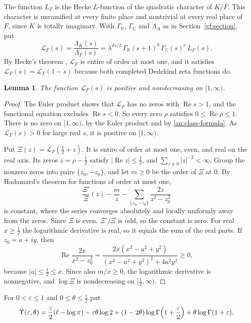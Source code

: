 \documentclass[11pt]{amsart}
\numberwithin{equation}{section}
\newtheorem{lemma}[equation]{Lemma}
\theoremstyle{definition}
\theoremstyle{remark}
\newcommand{\R}{\mathbb R}
\newcommand{\C}{\mathbb C}
\begin{document}
The function $L_F$ is the Hecke $L$-function of the quadratic character of
$K/F$. This character is unramified at every finite place and nontrivial at
every real place of $F$, since $K$ is totally imaginary. With $\Gamma_\R$,
$\Gamma_\C$ and $\Lambda_A$ as in Section~\ref{gf:section}, put
\begin{equation}\label{an:completion}
 \mathcal L_F(s)=\frac{\Lambda_K(s)}{\Lambda_F(s)}
 =\lambda^{ds/2}\,\Gamma_\R(s+1)^b\,\Gamma_\C(s)^c\,L_F(s).
\end{equation}
By Hecke's theorem \cite{Hecke1920,Tate1967}, $\mathcal L_F$ is entire of
order at most one, and it satisfies $\mathcal L_F(s)=\mathcal L_F(1-s)$
because both completed Dedekind zeta functions do.

\begin{lemma}\label{an:monotonicity}
The function $\mathcal L_F(s)$ is positive and nondecreasing on $[1,\infty)$.
\end{lemma}

\begin{proof}
The Euler product shows that $\mathcal L_F$ has no zeros with
$\operatorname{Re}s>1$, and the functional equation excludes
$\operatorname{Re}s<0$. So every zero $\rho$ satisfies $0\le\operatorname{Re}
\rho\le1$. There is no zero on $[1,\infty)$, by the Euler product and by
\eqref{an:class-formula}. As $\mathcal L_F(s)>0$ for large real $s$,
it is positive on $[1,\infty)$.

Put $\Xi(z)=\mathcal L_F(\frac12+z)$. It is entire of order at most one,
even, and real on the real axis. Its zeros $z=\rho-\frac12$ satisfy
$|\operatorname{Re}z|\le\frac12$, and $\sum_{z\ne0}|z|^{-2}<\infty$. Group
the nonzero zeros into pairs $\{z_0,-z_0\}$, and let $m\ge0$ be the order of
$\Xi$ at $0$. By Hadamard's theorem for functions of order at most one,
\[
 \frac{\Xi'}{\Xi}(z)-\frac mz-\sum_{\{z_0,-z_0\}}\frac{2z}{z^2-z_0^2}
\]
is constant, where the series converges absolutely and locally uniformly
away from the zeros. Since $\Xi$ is even, $\Xi'/\Xi$ is odd, so the constant
is zero. For real $x\ge\frac12$ the logarithmic derivative is real, so it
equals the sum of the real parts. If $z_0=a+iy$, then
\[
 \operatorname{Re}\frac{2x}{x^2-z_0^2}
 =\frac{2x(x^2-a^2+y^2)}{(x^2-a^2+y^2)^2+4a^2y^2}\ge0,
\]
because $|a|\le\frac12\le x$. Since also $m/x\ge0$, the logarithmic
derivative is nonnegative, and $\log\Xi$ is nondecreasing on
$[\frac12,\infty)$.
\end{proof}

For $0<\varepsilon\le1$ and $0\le\theta\le\frac12$ put
\begin{equation}\label{an:gamma}
 \Upsilon(\varepsilon,\theta)
 =\frac\varepsilon2(\ell-\log\pi)-\varepsilon\theta\log2
 +(1-2\theta)\log\Gamma\Bigl(1+\frac\varepsilon2\Bigr)
 +\theta\log\Gamma(1+\varepsilon).
\end{equation}
\end{document}
